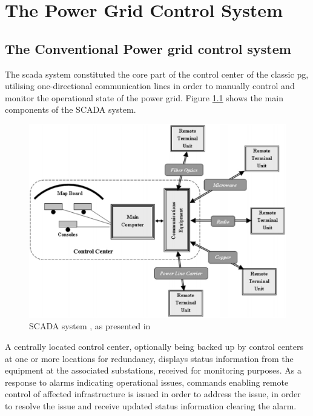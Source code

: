 \chapter{The Power Grid Control System}
\section{The Conventional Power grid control system}


The \acrshort{scada} system constituted the core part of the control center of the classic \acrlong{pg}, utilising one-directional communication lines in order to manually control and monitor the operational state of the power grid.
Figure \ref{fig:Blume-SCADA-system} shows the main components of the SCADA system.

\begin{figure}[ht]
\includegraphics[width=\linewidth]{figures/Blume-SCADA-system.eps}
\caption[SCADA system]{SCADA system , as presented in \cite{BlumeStevenW2007Epsb}}
\label{fig:Blume-SCADA-system}
\end{figure}



A centrally located control center, optionally being backed up by control centers at one or more locations for redundancy, displays status information from the equipment at the associated substations, received for monitoring purposes. As a response to alarms indicating operational issues, commands enabling remote control of affected infrastructure is issued in order to address the issue, in order to resolve the issue and receive updated status information clearing the alarm. 




